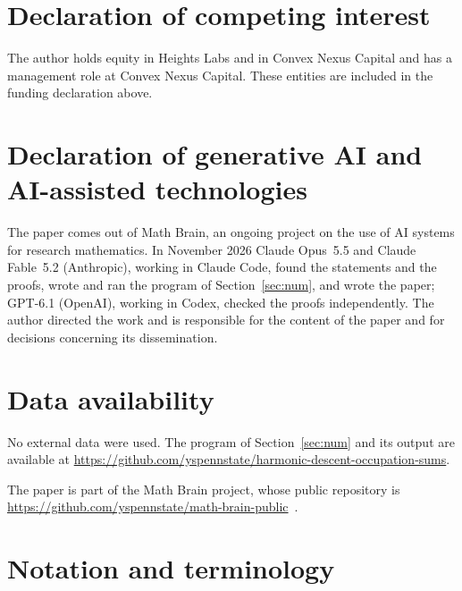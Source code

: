 \documentclass[11pt]{amsart}
\theoremstyle{remark}
\numberwithin{equation}{section}
\begin{document}
\section*{Declaration of competing interest}
The author holds equity in Heights Labs and in Convex Nexus Capital and
has a management role at Convex Nexus Capital. These entities are included
in the funding declaration above.

\section*{Declaration of generative AI and AI-assisted technologies}
The paper comes out of Math Brain, an ongoing project on the use of AI systems for research mathematics. In November 2026
Claude Opus~5.5 and Claude Fable~5.2 (Anthropic), working in Claude Code, found the statements and the proofs, wrote and
ran the program of Section~\ref{sec:num}, and wrote the paper; GPT-6.1 (OpenAI), working in Codex, checked the proofs
independently. The author directed the work and is responsible for the content of the paper and for decisions
concerning its dissemination.

\section*{Data availability}
No external data were used. The program of Section~\ref{sec:num} and its output are available at
\url{https://github.com/yspennstate/harmonic-descent-occupation-sums}.

The paper is part of the Math Brain project, whose public repository is \url{https://github.com/yspennstate/math-brain-public}~\cite{MathBrainRepo}.

\appendix
\section{Notation and terminology}\label{sec:notation}
\end{document}
